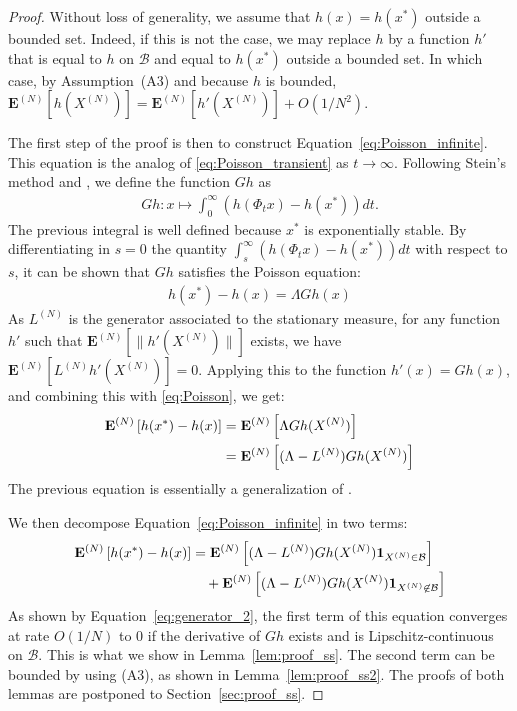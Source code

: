 \documentclass[sigconf]{acmart}
\newcommand\XN{X^{(N)}}
\newcommand\LN{L^{(N)}}
\newcommand\calB{\mathcal{B}}
\newcommand\espN[1]{{\mathchoice{\bespN{#1}}{\sespN{#1}}{\sespN{#1}}{\sespN{#1}}}}
\newcommand\bespN[1]{\mathbf{E}^{(N)}\left[#1\right]}
\newcommand\sespN[1]{\mathbf{E}^{(N)}[#1]}
\newcommand\snorm[1]{\|#1\|}
\newcommand\p[1]{\left(#1\right)}
\begin{document}
\begin{proof}
  Without loss of generality, we assume that $h(x)=h(x^*)$ outside a
  bounded set. Indeed, if this is not the case, we may replace $h$ by
  a function $h'$ that is equal to $h$ on $\calB$ and equal to
  $h(x^*)$ outside a bounded set. In which case, by Assumption~(A3)
  and because $h$ is bounded,
  $\sespN{h(\XN)} = \sespN{h'(\XN)}+O(1/N^2)$.
  
  The first step of the proof is then to construct
  Equation~\eqref{eq:Poisson_infinite}. This equation is the analog of
  \eqref{eq:Poisson_transient} as $t\to\infty$. Following Stein's
  method and \cite{ying2016rate}, we define the function $Gh$ as
  \begin{align*}
    Gh : x\mapsto \int_0^\infty \p{h(\Phi_t x)-h(x^*)}dt. 
  \end{align*}
  The previous integral is well defined because $x^*$ is exponentially
  stable. By differentiating in $s=0$ the quantity
  $\int_s^\infty \p{h(\Phi_t x)-h(x^*)}dt$ with respect to $s$, it can
  be shown that $Gh$ satisfies the Poisson equation:
  \begin{align}
    h(x^*)-h(x) = \Lambda Gh(x)
    \label{eq:Poisson}
  \end{align}
  As $\LN$
  is the generator associated to the stationary measure, for any
  function $h'$
  such that $\sespN{\snorm{h'(\XN)}}$
  exists, we have $\sespN{\LN
    h'(\XN) }=0$.  Applying this to the function $h'(x)=G
  h(x)$, and combining this with \eqref{eq:Poisson}, we get:
\begin{align}
  \espN{h(x^*)-h(x)} &= \espN{\Lambda Gh(\XN)}\nonumber\\
                     &=\espN{(\Lambda-\LN)Gh(\XN)}
      \label{eq:Poisson_infinite}
\end{align}
The previous equation is essentially a generalization of
\cite[Equation~(4) and Equation~(7)]{ying2016rate}.

We then decompose Equation~\eqref{eq:Poisson_infinite} in two terms:
\begin{align*}
  \espN{h(x^*)-h(x)}
  &=\espN{(\Lambda-\LN)Gh(\XN)\mathbf{1}_{\XN\in\calB}}\\
  &\quad +\espN{(\Lambda-\LN)Gh(\XN)\mathbf{1}_{\XN\not\in\calB}}
\end{align*}
As shown by Equation~\eqref{eq:generator_2}, the first term of this
equation converges at rate $O(1/N)$
to $0$
if the derivative of $Gh$
exists and is Lipschitz-continuous on $\calB$.
This is what we show in Lemma~\ref{lem:proof_ss}. The second term can
be bounded by using (A3), as shown in Lemma~\ref{lem:proof_ss2}.  The
proofs of both lemmas are postponed to Section~\ref{sec:proof_ss}.
\end{proof}
\end{document}
